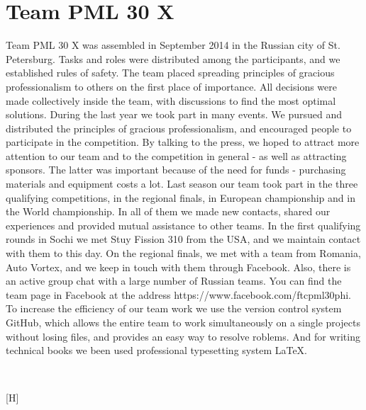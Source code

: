 
\section{Team PML 30 X} 
	Team PML 30 X was assembled in September 2014 in the Russian city of St. Petersburg. Tasks and roles were distributed among the participants, and we established rules of safety. The team placed spreading principles of gracious professionalism to others on the first place of importance. All decisions were made collectively inside the team, with discussions to find the most optimal solutions. 
	During the last year we took part in many events. We pursued and distributed the principles of gracious professionalism, and encouraged people to participate in the competition. By talking to the press, we hoped to attract more attention to our team and to the competition in general - as well as attracting sponsors. The latter was important because of the need for funds - purchasing materials and equipment costs a lot.
	Last season our team took part in the three qualifying competitions, in the regional finals, in European championship and in the World championship. In all of them we made new contacts, shared our experiences and provided mutual assistance to other teams. In the first qualifying rounds in Sochi we met Stuy Fission 310 from the USA, and we maintain contact with them to this day. On the regional finals, we met with a team from Romania, Auto Vortex, and we keep in touch with them through Facebook. Also, there is an active group chat with a large number of Russian teams. You can find the team page in Facebook at the address https://www.facebook.com/ftcpml30phi.
	To increase the efficiency of our team work we use the version control system GitHub, which allows the entire team to work simultaneously on a single projects without losing files, and provides an easy way to resolve roblems. And for writing technical books we been used professional typesetting system LaTeX.
	\begin{figure}[H]
		\\
	\end{figure}[H]
\fillpage

